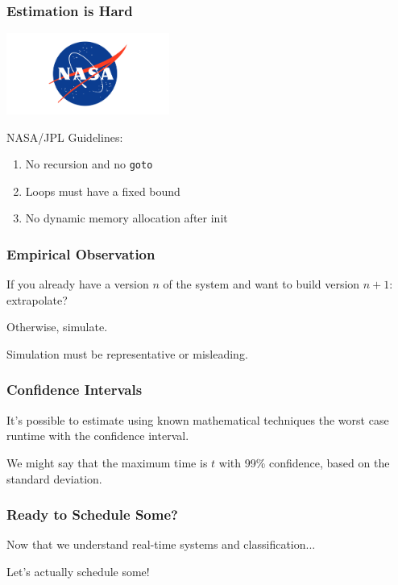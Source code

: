 \begin{frame}
\frametitle{Estimation is Hard}

\begin{center}
	\includegraphics[width=0.4\textwidth]{images/nasa-logo.png}
\end{center}

NASA/JPL Guidelines:
\begin{enumerate}
	\item No recursion and no \texttt{goto}
	\item Loops must have a fixed bound
	\item No dynamic memory allocation after init
\end{enumerate}

\end{frame}

\begin{frame}
\frametitle{Empirical Observation}

If you already have a version $n$ of the system and want to build version $n+1$: extrapolate?

Otherwise, simulate.

Simulation must be representative or misleading.

\end{frame}

\begin{frame}
\frametitle{Confidence Intervals}

It's possible to estimate using known mathematical techniques the worst case runtime with the \alert{confidence interval}.

We might say that the maximum time is $t$ with 99\% confidence, based on the standard deviation.

\end{frame}

\begin{frame}
\frametitle{Ready to Schedule Some?}

Now that we understand real-time systems and classification...

Let's actually schedule some!

\end{frame}




